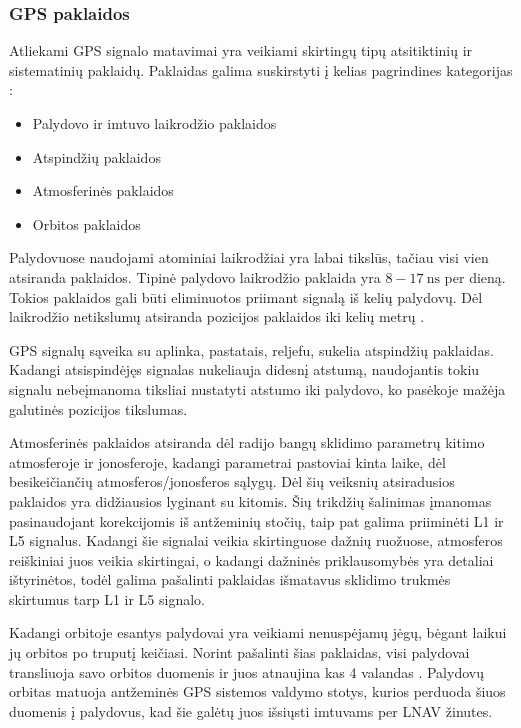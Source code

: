 \documentclass[main.tex]{subfiles}
\begin{document}
\subsubsection {GPS paklaidos}

Atliekami GPS signalo matavimai yra veikiami skirtingų tipų atsitiktinių ir sistematinių
paklaidų. Paklaidas galima suskirstyti į kelias pagrindines kategorijas \cite{KUMAR20213_chapter1}:

\begin{itemize}
    \item Palydovo ir imtuvo laikrodžio paklaidos
    \item Atspindžių paklaidos
    \item Atmosferinės paklaidos
    \item Orbitos paklaidos
\end{itemize}

Palydovuose naudojami atominiai laikrodžiai yra labai tikslūs, tačiau visi vien atsiranda paklaidos.
Tipinė palydovo laikrodžio paklaida yra $8-17\ \mathrm{ns}$ per dieną. Tokios paklaidos
gali būti eliminuotos priimant signalą iš kelių palydovų. Dėl laikrodžio netikslumų atsiranda
pozicijos paklaidos iki kelių metrų \cite{KUMAR20213_chapter1}.

GPS signalų sąveika su aplinka, pastatais, reljefu, sukelia atspindžių paklaidas. Kadangi
atsispindėjęs signalas nukeliauja didesnį atstumą, naudojantis tokiu signalu nebeįmanoma
tiksliai nustatyti atstumo iki palydovo, ko pasėkoje mažėja galutinės pozicijos tikslumas.

Atmosferinės paklaidos atsiranda dėl radijo bangų sklidimo parametrų kitimo atmosferoje ir
jonosferoje, kadangi parametrai pastoviai kinta laike, dėl besikeičiančių atmosferos/jonosferos
sąlygų. Dėl šių veiksnių atsiradusios paklaidos yra didžiausios lyginant su kitomis.
Šių trikdžių šalinimas įmanomas pasinaudojant korekcijomis iš antžeminių stočių, taip
pat galima priiminėti L1 ir L5 signalus. Kadangi šie signalai veikia skirtinguose
dažnių ruožuose, atmosferos reiškiniai juos veikia skirtingai, o kadangi
dažninės priklausomybės yra detaliai ištyrinėtos, todėl galima pašalinti
paklaidas išmatavus sklidimo trukmės skirtumus tarp L1 ir L5 signalo.

Kadangi orbitoje esantys palydovai yra veikiami nenuspėjamų jėgų, bėgant laikui jų orbitos
po truputį keičiasi. Norint pašalinti šias paklaidas, visi palydovai transliuoja savo
orbitos duomenis ir juos atnaujina kas 4 valandas \cite{sps_standard}. Palydovų orbitas
matuoja antžeminės GPS sistemos valdymo stotys, kurios perduoda šiuos duomenis
į palydovus, kad šie galėtų juos išsiųsti imtuvams per LNAV žinutes.
\end{document}
